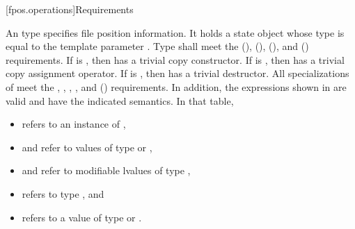 [fpos.operations]{Requirements}

\pnum
{}%
%
An  type specifies file position information.
It holds a state object
whose type is equal to the template parameter .
Type  shall meet
the  (),
 (),
 (), and
 () requirements.
If  is ,
then  has a trivial copy constructor.
If  is ,
then  has a trivial copy assignment operator.
If  is ,
then  has a trivial destructor.
All specializations of  meet
the ,
,
,
,
and  () requirements.
In addition, the expressions shown in 
are valid and have the indicated semantics.
In that table,
\begin{itemize}
\item {} refers to an instance of ,
\item {} and  refer to values
of type  or ,
\item {} and  refer to modifiable lvalues of type ,
\item {} refers to type , and
\item {} refers to a value
of type  or .
\end{itemize}

